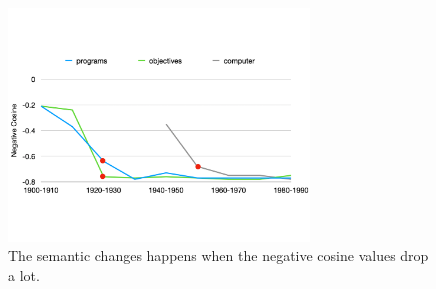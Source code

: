 \documentclass[a4paper]{article}
\theoremstyle{plain}
\theoremstyle{definition}
\begin{document}
\begin{figure}[h]
\includegraphics[width=8cm]{change.pdf}
\centering
\caption{The semantic changes happens when the negative cosine values drop a lot.}
\label{fig:change_time}
\end{figure}
\end{document}

